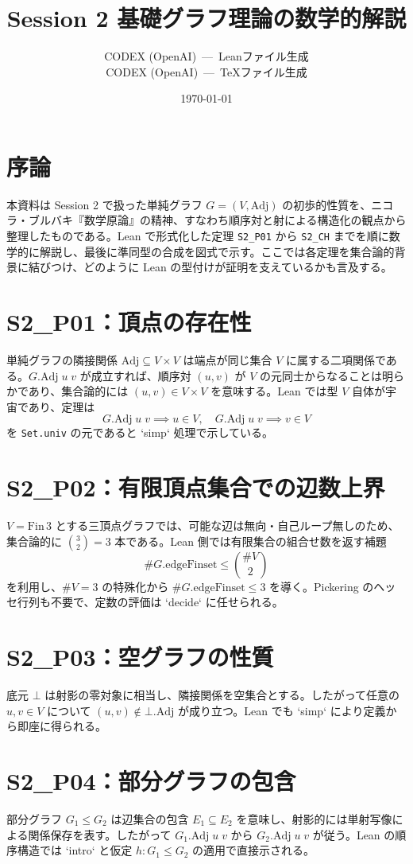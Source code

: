\documentclass[a4paper]{ltjsarticle}
\title{Session 2 基礎グラフ理論の数学的解説}
\author{CODEX (OpenAI)~---~Leanファイル生成 \\ CODEX (OpenAI)~---~TeXファイル生成}
\date{\today}
\begin{document}
\maketitle

\tableofcontents

\section{序論}
本資料は Session 2 で扱った単純グラフ $G = (V,\mathrm{Adj})$ の初歩的性質を、ニコラ・ブルバキ『数学原論』の精神、すなわち順序対と射による構造化の観点から整理したものである。Lean で形式化した定理 \texttt{S2\_P01} から \texttt{S2\_CH} までを順に数学的に解説し、最後に準同型の合成を図式で示す。ここでは各定理を集合論的背景に結びつけ、どのように Lean の型付けが証明を支えているかも言及する。

\section{S2\_P01：頂点の存在性}
単純グラフの隣接関係 $\mathrm{Adj} \subseteq V \times V$ は端点が同じ集合 $V$ に属する二項関係である。$G.\mathrm{Adj}\;u\;v$ が成立すれば、順序対 $(u,v)$ が $V$ の元同士からなることは明らかであり、集合論的には $(u,v) \in V \times V$ を意味する。Lean では型 $V$ 自体が宇宙であり、定理は
\[
  G.\mathrm{Adj}\;u\;v \implies u \in V,\quad G.\mathrm{Adj}\;u\;v \implies v \in V
\]
を \texttt{Set.univ} の元であると `simp` 処理で示している。

\section{S2\_P02：有限頂点集合での辺数上界}
$V = \mathrm{Fin}\,3$ とする三頂点グラフでは、可能な辺は無向・自己ループ無しのため、集合論的に $\binom{3}{2} = 3$ 本である。Lean 側では有限集合の組合せ数を返す補題
\[
  \#G.\mathrm{edgeFinset} \le \binom{\#V}{2}
\]
を利用し、$\#V = 3$ の特殊化から $\#G.\mathrm{edgeFinset} \le 3$ を導く。Pickering のヘッセ行列も不要で、定数の評価は `decide` に任せられる。

\section{S2\_P03：空グラフの性質}
底元 $\bot$ は射影の零対象に相当し、隣接関係を空集合とする。したがって任意の $u,v \in V$ について $(u,v) \notin \bot.\mathrm{Adj}$ が成り立つ。Lean でも `simp` により定義から即座に得られる。

\section{S2\_P04：部分グラフの包含}
部分グラフ $G_1 \le G_2$ は辺集合の包含 $E_1 \subseteq E_2$ を意味し、射影的には単射写像による関係保存を表す。したがって $G_1.\mathrm{Adj}\;u\;v$ から $G_2.\mathrm{Adj}\;u\;v$ が従う。Lean の順序構造では `intro` と仮定 $h : G_1 \le G_2$ の適用で直接示される。
\end{document}
